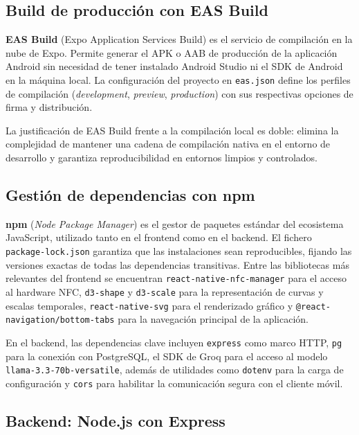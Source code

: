 \subsection{Build de producción con EAS Build}
\label{subsec:herramienta-eas}

\textbf{EAS Build} (Expo Application Services Build) \cite{eas2021} es el servicio de
compilación en la nube de Expo. Permite generar el APK o AAB de producción de la
aplicación Android sin necesidad de tener instalado Android Studio ni el SDK de Android
en la máquina local. La configuración del proyecto en \texttt{eas.json} define los
perfiles de compilación (\textit{development}, \textit{preview}, \textit{production})
con sus respectivas opciones de firma y distribución.

La justificación de EAS Build frente a la compilación local es doble: elimina la
complejidad de mantener una cadena de compilación nativa en el entorno de desarrollo y
garantiza reproducibilidad en entornos limpios y controlados.

\subsection{Gestión de dependencias con npm}
\label{subsec:herramienta-npm}

\textbf{npm} (\textit{Node Package Manager}) \cite{npm2010} es el gestor de paquetes
estándar del ecosistema JavaScript, utilizado tanto en el frontend como en el backend. El
fichero \texttt{package-lock.json} garantiza que las instalaciones sean reproducibles,
fijando las versiones exactas de todas las dependencias transitivas. Entre las bibliotecas
más relevantes del frontend se encuentran \texttt{react-native-nfc-manager} para el acceso
al hardware NFC, \texttt{d3-shape} y \texttt{d3-scale} para la representación de curvas y
escalas temporales, \texttt{react-native-svg} para el renderizado gráfico y
\texttt{@react-navigation/bottom-tabs} para la navegación principal de la aplicación.

En el backend, las dependencias clave incluyen \texttt{express} como marco HTTP,
\texttt{pg} para la conexión con PostgreSQL, el SDK de Groq para el acceso al modelo
\texttt{llama-3.3-70b-versatile}, además de utilidades como \texttt{dotenv} para la carga
de configuración y \texttt{cors} para habilitar la comunicación segura con el cliente móvil.

\subsection{Backend: Node.js con Express}
\label{subsec:herramienta-node}


